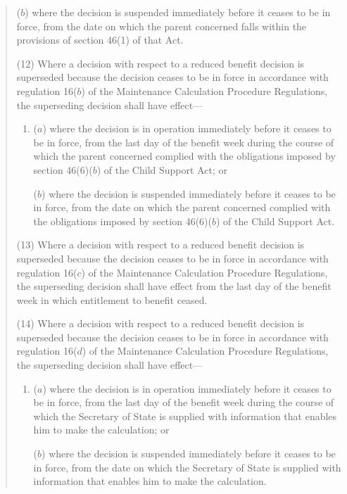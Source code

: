 \documentclass[12pt,a4paper]{article}
\begin{document}
\begin{quotation}
\begin{enumerate}
($b$) where the decision is suspended immediately before it ceases to be in force, from the date on which the parent concerned falls within the provisions of section 46(1) of that Act.
\end{enumerate}

(12) Where a decision with respect to a reduced benefit decision is superseded because the decision ceases to be in force in accordance with regulation 16($b$)  of the Maintenance Calculation Procedure Regulations, the superseding decision shall have effect—
\begin{enumerate}\item[]
($a$) where the decision is in operation immediately before it ceases to be in force, from the last day of the benefit week during the course of which the parent concerned complied with the obligations imposed by section 46(6)($b$)  of the Child Support Act; or

($b$) where the decision is suspended immediately before it ceases to be in force, from the date on which the parent concerned complied with the obligations imposed by section 46(6)($b$)  of the Child Support Act.
\end{enumerate}

(13) Where a decision with respect to a reduced benefit decision is superseded because the decision ceases to be in force in accordance with regulation 16($c$)  of the Maintenance Calculation Procedure Regulations, the superseding decision shall have effect from the last day of the benefit week in which entitlement to benefit ceased.

(14) Where a decision with respect to a reduced benefit decision is superseded because the decision ceases to be in force in accordance with regulation 16($d$)  of the Maintenance Calculation Procedure Regulations, the superseding decision shall have effect—
\begin{enumerate}\item[]
($a$) where the decision is in operation immediately before it ceases to be in force, from the last day of the benefit week during the course of which the Secretary of State is supplied with information that enables him to make the calculation; or

($b$) where the decision is suspended immediately before it ceases to be in force, from the date on which the Secretary of State is supplied with information that enables him to make the calculation.
\end{enumerate}


\end{quotation}
\end{document}
